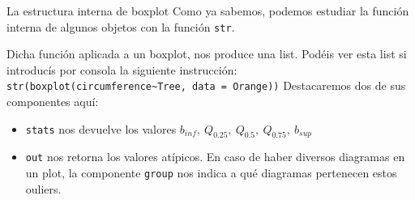\documentclass[
  ignorenonframetext,
  aspectratio=169]{beamer}
\providecommand{\tightlist}{%
  \setlength{\itemsep}{0pt}\setlength{\parskip}{0pt}}
\begin{document}
\begin{frame}[fragile]{La estructura interna de boxplot}
\protect\hypertarget{la-estructura-interna-de-boxplot}{}
Como ya sabemos, podemos estudiar la función interna de algunos objetos
con la función \texttt{str}.

Dicha función aplicada a un boxplot, nos produce una list. Podéis ver
esta list si introducís por consola la siguiente instrucción:
\texttt{str(boxplot(circumference\textasciitilde{}Tree,\ data\ =\ Orange))}
Destacaremos dos de sus componentes aquí:

\begin{itemize}
\tightlist
\item
  \texttt{stats} nos devuelve los valores
  \(b_{inf},\ Q_{0.25},\ Q_{0.5},\ Q_{0.75},\ b_{sup}\)
\item
  \texttt{out} nos retorna los valores atípicos. En caso de haber
  diversos diagramas en un plot, la componente \texttt{group} nos indica
  a qué diagramas pertenecen estos ouliers.
\end{itemize}
\end{frame}
\end{document}
